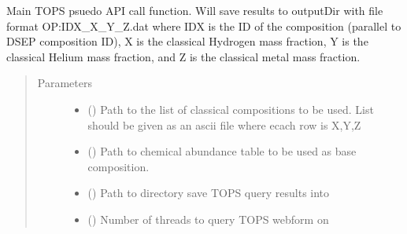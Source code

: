 \documentclass[letterpaper,10pt,english]{sphinxmanual}
\begin{document}
\begin{fulllineitems}
\label{\detokenize{pyTOPSScrape.api:pyTOPSScrape.api.api.call}}
\sphinxAtStartPar
Main TOPS psuedo API call function. Will save results to outputDir with
file format OP:IDX\_X\_Y\_Z.dat where IDX is the ID of the composition (parallel
to DSEP composition ID), X is the classical Hydrogen mass fraction, Y  is
the classical Helium mass fraction, and Z is the classical metal mass
fraction.
\begin{quote}\begin{description}
\item[{Parameters}] \leavevmode\begin{itemize}
\item {} 
\sphinxAtStartPar
{} () \textendash{} Path to the list of classical compositions to be used. List should
be given as an ascii file where ecach row is X,Y,Z

\item {} 
\sphinxAtStartPar
{} () \textendash{} Path to chemical abundance table to be used as base composition.

\item {} 
\sphinxAtStartPar
{} () \textendash{} Path to directory save TOPS query results into

\item {} 
\sphinxAtStartPar
{} () \textendash{} Number of threads to query TOPS webform on

\end{itemize}

\end{description}\end{quote}

\end{fulllineitems}

\end{document}
